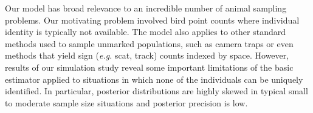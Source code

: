 Our model has broad relevance to an incredible number of animal
sampling problems. Our motivating problem involved bird point counts
where individual
identity is typically not available. The model also applies
to other standard methods used to sample unmarked
populations,  such as camera traps
or even methods that yield sign ({\it e.g.} scat, track) counts
indexed by space. However, results of our simulation study reveal some
important limitations of the basic
estimator applied to situations in which none of the individuals can
be uniquely identified. In particular, posterior
distributions are highly skewed in typical small to moderate sample
size situations and posterior precision is low.

